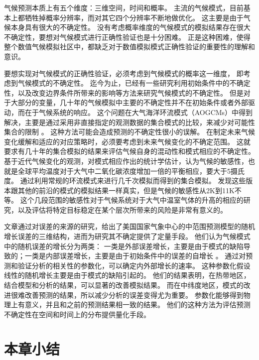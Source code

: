 气候预测本质上有五个维度：三维空间，时间和概率。 
主流的气候模式，目前基本上都牺牲掉概率分辨率，而对其它四个分辨率不断地做优化。
这主要是由于气候本身具有很大的不确定性。
没有考虑概率维度的气候模式的模拟结果存在很大不确定性，要想对气候模式进行正确性验证也是十分困难。
正是这种困难，使得整个数值气候模拟社区中，都缺乏对于数值模拟模式正确性验证的重要性的理解和意识\cite{whitner1989guidelines}。 

 
要想实现对气候模式的正确性验证，必须考虑到气候模式的概率这一维度， 即考虑到气候模式的不确定性。 
迄今为止，已经有一些研究利用初始条件中的不确定性，以及改变边界条件所带来的影响等方法来研究气候模式的不确定性。
但是对于大部分的变量，几十年的气候模拟中主要的不确定性并不在初始条件或者外部驱动，而在于气候系统的响应。
这个问题在大气海洋环流模式（AOGCMs）中得到解决，主要是通过采用非直接指定的观测数据的集合模式的比较，来减少对可能性集合的限制\cite{allen2002towards} 。 
这种方法可能会造成预测的不确定性很小的误解。
在制定未来气候变化缓解和适应的对应策略时，必须要考虑到未来气候变化的不确定范围。
这就要求有几十年的集合模拟的结果来评估气候自身的混动性和模式相应的不确定性。 
基于近代气候变化的观测，对模式相应作出的统计学估计，认为气候的敏感性，也就是全球平均温度对于大气中二氧化碳浓度增加一倍的平衡相应，要大于5摄氏度\cite{stainforth2005uncertainty}。
通过利用常规的环流模式来进行几千次模拟而得到的集合模拟。 发现这些版本跟其他的前沿的模式的模拟结果一样真实，但是气候的敏感性从2K到11K不等。
这个几段范围的敏感性对于气候系统对于大气中温室气体的升高的相应的研究，以及评估将特定目标稳定在某个层次所带来的风险是非常有意义的。


 
文章\cite{reynolds1994random}通过对误差的来源的研究，给出了美国国家气象中心的中范围预测模型的随机增长误差的三维结构，进而为研究其不确定提供了定量手段。
他们认为气候模式中的随机误差的增长分为两类： 一类是外部误差增长，主要是由于模式的缺陷导致的；一类是内部误差增长，主要是由于初始条件中的误差的自增长 。 
通过对预测和验证分析的相关性的参数化，可以确定内外部增长的速率。
这种参数化假设线性的随机增长主要是由于模式的缺陷引起的。 
他们的结果表明，在热带地区，结合模型和分析的结果，可以显著的改善模拟结果。
而在中纬度地区，模式的改进很难改善预测的结果，所以减少分析的误差变得尤为重要。 
参数化能够得到物理上有意义，并且和之前的预测结果相一致的结果。
他们的这种方法为评估预测不确定性在空间和时间上的分布提供量化手段。


\section{本章小结}
\label{related:Conclude}

